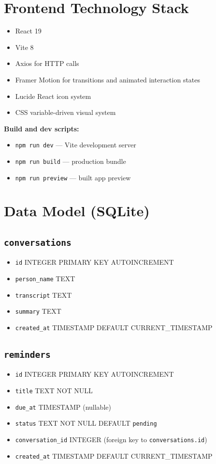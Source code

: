 \documentclass[12pt,a4paper]{article}
\begin{document}
\section{Frontend Technology Stack}
\begin{itemize}
  \item React 19
  \item Vite 8
  \item Axios for HTTP calls
  \item Framer Motion for transitions and animated interaction states
  \item Lucide React icon system
  \item CSS variable-driven visual system
\end{itemize}

\textbf{Build and dev scripts:}
\begin{itemize}
  \item \texttt{npm run dev} --- Vite development server
  \item \texttt{npm run build} --- production bundle
  \item \texttt{npm run preview} --- built app preview
\end{itemize}

\section{Data Model (SQLite)}

\subsection{\texttt{conversations}}
\begin{itemize}
  \item \texttt{id} INTEGER PRIMARY KEY AUTOINCREMENT
  \item \texttt{person\_name} TEXT
  \item \texttt{transcript} TEXT
  \item \texttt{summary} TEXT
  \item \texttt{created\_at} TIMESTAMP DEFAULT CURRENT\_TIMESTAMP
\end{itemize}

\subsection{\texttt{reminders}}
\begin{itemize}
  \item \texttt{id} INTEGER PRIMARY KEY AUTOINCREMENT
  \item \texttt{title} TEXT NOT NULL
  \item \texttt{due\_at} TIMESTAMP (nullable)
  \item \texttt{status} TEXT NOT NULL DEFAULT \texttt{pending}
  \item \texttt{conversation\_id} INTEGER (foreign key to \texttt{conversations.id})
  \item \texttt{created\_at} TIMESTAMP DEFAULT CURRENT\_TIMESTAMP
\end{itemize}
\end{document}
